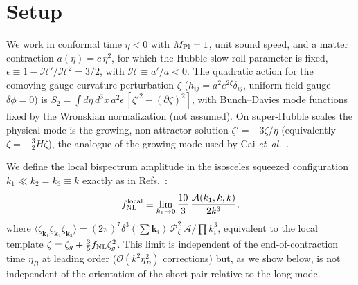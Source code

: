 \documentclass[aps,prd,reprint,superscriptaddress,showpacs,preprintnumbers,nofootinbib,longbibliography,floatfix]{revtex4-2}
\newcommand{\fnl}{f_{\rm NL}}
\newcommand{\Pzeta}{\mathcal{P}_\zeta}
\newcommand{\etal}{\textit{et~al.}}
\begin{document}
\begin{abstract}
own cubic term -- found in the loop-quantum-cosmology literature to enhance
non-Gaussianity by orders of magnitude -- is not computed here. A survey-scale bispectrum
measurement can currently discriminate $-35/16$ from $-35/8$: DESI DR1
($f_{\rm NL}^{\rm loc}=-3.6^{+9.0}_{-9.1}$, Chaussidon \etal\ 2024) is consistent with
$-35/16$ at $0.16\sigma$ (merger-model QSO bias) but has essentially no discriminating
power between the two amplitudes ($|f_{\rm NL}|/\sigma=0.24$), while SPHEREx, projected
through the bounce-shape/local-template overlap $r=0.84$ (this lab's companion forecast),
separates them by $2.6$--$4.4\sigma$ depending on channel.
\end{abstract}

\maketitle

\section{Setup}

We work in conformal time $\eta<0$ with $M_{\rm Pl}=1$, unit sound speed, and a matter
contraction $a(\eta)=c\,\eta^2$, for which the Hubble slow-roll parameter is fixed,
$\epsilon\equiv1-\mathcal H'/\mathcal H^2=3/2$, with $\mathcal H\equiv a'/a<0$. The
quadratic action for the comoving-gauge curvature perturbation $\zeta$
($h_{ij}=a^2e^{2\zeta}\delta_{ij}$, uniform-field gauge $\delta\phi=0$) is
$S_2=\int d\eta\,d^3x\,a^2\epsilon\,[\zeta'^2-(\partial\zeta)^2]$, with Bunch--Davies mode
functions fixed by the Wronskian normalization (not assumed). On super-Hubble scales the
physical mode is the growing, non-attractor solution $\zeta'=-3\zeta/\eta$
(equivalently $\dot\zeta=-\tfrac32H\zeta$), the analogue of the growing mode used by
Cai \etal~\cite{Cai:2009fn}.

We define the local bispectrum amplitude in the isosceles squeezed configuration
$k_1\ll k_2=k_3\equiv k$ exactly as in Refs.~\cite{Cai:2009fn,Li:2016}:
\begin{equation}
f_{\rm NL}^{\rm local}\equiv\lim_{k_1\to0}\frac{10}{3}\,\frac{\mathcal A(k_1,k,k)}{2k^3},
\end{equation}
where $\langle\zeta_{\mathbf k_1}\zeta_{\mathbf k_2}\zeta_{\mathbf k_3}\rangle
=(2\pi)^7\delta^3(\textstyle\sum\mathbf k_i)\,\Pzeta^2\,\mathcal A/\prod k_i^3$, equivalent
to the local template $\zeta=\zeta_g+\tfrac35\fnl\zeta_g^2$. This limit is independent of
the end-of-contraction time $\eta_B$ at leading order ($\mathcal O(k^2\eta_B^2)$
corrections) but, as we show below, is not independent of the orientation of the short
pair relative to the long mode.
\end{document}
